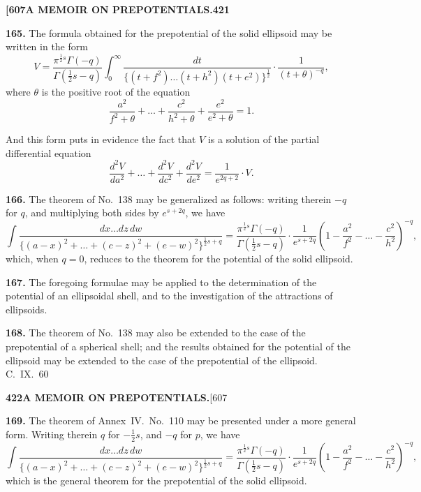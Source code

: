 \documentclass[11pt,a4paper]{book}
\begin{document}
{\newpage
\noindent\textbf{[607}\hspace{\fill}\textbf{A MEMOIR ON PREPOTENTIALS.}\hspace{\fill}\textbf{421}

\noindent\textbf{165.}
The formula obtained for the prepotential of the solid ellipsoid may be written in the form
\[
V = \frac{\pi^{\frac{1}{2}s}\Gamma(-q)}{\Gamma(\frac{1}{2}s-q)} \int_0^\infty \frac{dt}{\{(t+f^2)\ldots(t+h^2)(t+e^2)\}^{\frac{1}{2}}} \cdot \frac{1}{(t + \theta)^{-q}},
\]
where $\theta$ is the positive root of the equation
\[
\frac{a^2}{f^2+\theta} + \ldots + \frac{c^2}{h^2+\theta} + \frac{e^2}{e^2+\theta} = 1.
\]

And this form puts in evidence the fact that $V$ is a solution of the partial differential equation
\[
\frac{d^2V}{da^2} + \ldots + \frac{d^2V}{dc^2} + \frac{d^2V}{de^2} = \frac{1}{e^{2q+2}} \cdot V.
\]

\medskip
\noindent\textbf{166.}
The theorem of No.~138 may be generalized as follows: writing therein $-q$ for $q$, and multiplying both sides by $e^{s+2q}$, we have
\[
\int \frac{dx\ldots dz\, dw}{\{(a-x)^2 + \ldots + (c-z)^2 + (e-w)^2\}^{\frac{1}{2}s+q}} = \frac{\pi^{\frac{1}{2}s}\Gamma(-q)}{\Gamma(\frac{1}{2}s-q)} \cdot \frac{1}{e^{s+2q}} \left(1 - \frac{a^2}{f^2} - \ldots - \frac{c^2}{h^2}\right)^{-q},
\]
which, when $q = 0$, reduces to the theorem for the potential of the solid ellipsoid.

\medskip
\noindent\textbf{167.}
The foregoing formulae may be applied to the determination of the potential of an ellipsoidal shell, and to the investigation of the attractions of ellipsoids.

\medskip
\noindent\textbf{168.}
The theorem of No.~138 may also be extended to the case of the prepotential of a spherical shell; and the results obtained for the potential of the ellipsoid may be extended to the case of the prepotential of the ellipsoid.
\hfill C.~IX.\ 60

\newpage
\noindent\textbf{422}\hspace{\fill}\textbf{A MEMOIR ON PREPOTENTIALS.}\hspace{\fill}[607

\noindent\textbf{169.}
The theorem of Annex~IV.\ No.~110 may be presented under a more general form. Writing therein $q$ for $-\frac{1}{2}s$, and $-q$ for $p$, we have
\[
\int \frac{dx\ldots dz\, dw}{\{(a-x)^2 + \ldots + (c-z)^2 + (e-w)^2\}^{\frac{1}{2}s+q}} = \frac{\pi^{\frac{1}{2}s}\Gamma(-q)}{\Gamma(\frac{1}{2}s-q)} \cdot \frac{1}{e^{s+2q}} \left(1 - \frac{a^2}{f^2} - \ldots - \frac{c^2}{h^2}\right)^{-q},
\]
which is the general theorem for the prepotential of the solid ellipsoid.

}
\end{document}

